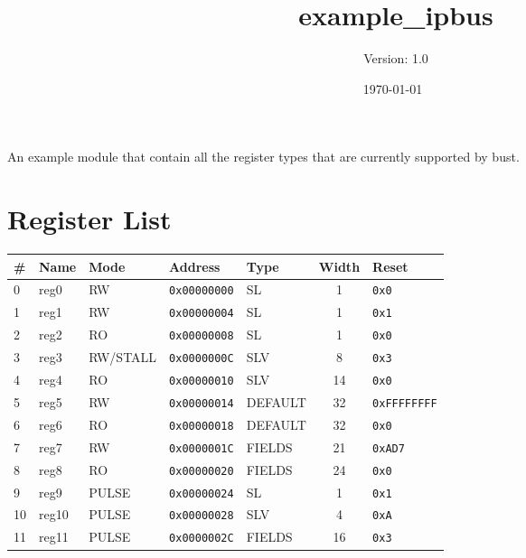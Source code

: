 \documentclass{article}
\title{example{\_}ipbus}
\author{Version: 1.0}
\date{\today\ \currenttime}
\begin{document}
\maketitle
\thispagestyle{fancy}

An example module that contain all the register types that are currently supported by bust.

\section{Register List}

\begin{table}[h!]
  \begin{center}
    \label{tab:table1}
    \begin{tabularx}{\linewidth}{|l|X|l|l|l|c|l|}
      \hline
      \textbf{\#} & \textbf{Name} & \textbf{Mode} & \textbf{Address} & \textbf{Type} & \textbf{Width} &
      \textbf{Reset} \\
      \hline
      0 & reg0 & RW & \texttt{0x00000000} & SL & 1 & \texttt{0x0} \\
      \hline
      1 & reg1 & RW & \texttt{0x00000004} & SL & 1 & \texttt{0x1} \\
      \hline
      2 & reg2 & RO & \texttt{0x00000008} & SL & 1 & \texttt{0x0} \\
      \hline
      3 & reg3 & RW/STALL & \texttt{0x0000000C} & SLV & 8 & \texttt{0x3} \\
      \hline
      4 & reg4 & RO & \texttt{0x00000010} & SLV & 14 & \texttt{0x0} \\
      \hline
      5 & reg5 & RW & \texttt{0x00000014} & DEFAULT & 32 & \texttt{0xFFFFFFFF} \\
      \hline
      6 & reg6 & RO & \texttt{0x00000018} & DEFAULT & 32 & \texttt{0x0} \\
      \hline
      7 & reg7 & RW & \texttt{0x0000001C} & FIELDS & 21 & \texttt{0xAD7} \\
      \hline
      8 & reg8 & RO & \texttt{0x00000020} & FIELDS & 24 & \texttt{0x0} \\
      \hline
      9 & reg9 & PULSE & \texttt{0x00000024} & SL & 1 & \texttt{0x1} \\
      \hline
      10 & reg10 & PULSE & \texttt{0x00000028} & SLV & 4 & \texttt{0xA} \\
      \hline
      11 & reg11 & PULSE & \texttt{0x0000002C} & FIELDS & 16 & \texttt{0x3} \\
      \hline
    \end{tabularx}
  \end{center}
\end{table}
\end{document}
